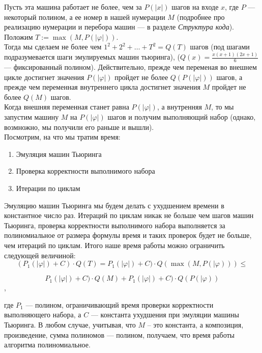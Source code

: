 \documentclass[paper=a4, fontsize=11pt]{scrartcl}
\begin{document}
Пусть эта машина работает не более, чем за $P(|x|)$ шагов на входе $x$, где $P$
--- некоторый полином, а ее номер в нашей нумерации $M$
(подробнее про реализацию нумерации и перебора машин ---
 в разделе \textit{Структура кода}).\\


Положим $T := \max(M, P(|\varphi|))$.\\


Тогда мы сделаем не более чем
$1^2 + 2^2 + \ldots + T^2 = Q(T)$ шагов (под шагами подразумевается шаги
эмулируемых машин тьюринга),
($Q(x) = \frac{x(x + 1)(2x + 1)}{6}$ --- фиксированный полином). Действительно,
прежде чем переменая во внешнем цикле достигнет значения $P(|\varphi|)$ пройдет
не более $Q(P(|\varphi|))$ шагов, а прежде чем переменная внутреннего цикла
достигнет значения $M$ пройдет не более $Q(M)$ шагов.\\


Когда внешняя переменная станет равна $P(|\varphi|)$, а внутренняя $M$, то мы
запустим машину $M$ на $P(|\varphi|)$ шагов и получим выполняющий набор
(однако, возмножно, мы получили его раньше и вышли).\\


Посмотрим, на что мы тратим время:\\


\begin{enumerate}
\item Эмуляция машин Тьюринга
\item Проверка корректности выполнимого набора
\item Итерации по циклам
\end{enumerate}


Эмуляцию машин Тьюринга мы будем делать с ухудшением времени в константное число
раз. Итераций по циклам никак не больше чем шагов машин Тьюринга, проверка
корректности выполнимого набора выполняется за полиномиальное от размера формулы
время и таких проверок будет не больше, чем итераций по циклам. Итого наше время
работы можно ограничить следующей величиной:\\


$$(P_1(|\varphi|)  + C)\cdot Q(T) =
    P_1(|\varphi|) + C)\cdot Q(\max(M, P(|\varphi))) \leq$$

$$P_1(|\varphi|) + C)\cdot Q(M) + P_1(|\varphi|) + C)\cdot Q(P(|\varphi))$$,


где $P_1$ --- полином, ограничивающий время проверки корректности выполняющего
набора, а $C$ --- константа ухудшения при эмуляции машины Тьюринга.
В любом случае, учитывая, что $M$ -- это константа, а композиция, произведение,
сумма полиномов --- полином, получаем, что время работы
алгоритма полиномиальное.\\
\end{document}
